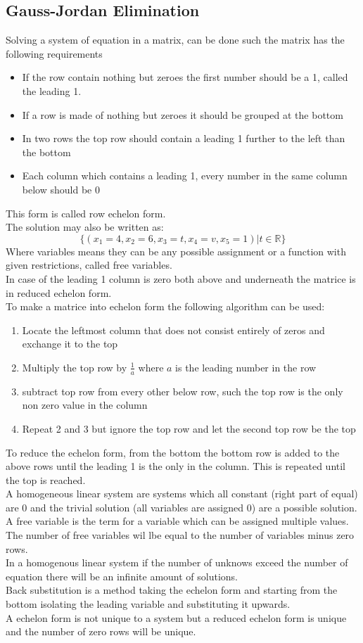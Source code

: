 \documentclass[12pt, a4paper]{article}
\begin{document}
		\subsection{Gauss-Jordan Elimination}
			Solving a system of equation in a matrix, can be done such the matrix has the following requirements
			\begin{itemize}
				\item If the row contain nothing but zeroes the first number should be a 1, called the leading 1.
				\item If a row is made of nothing but zeroes it should be grouped at the bottom
				\item In two rows the top row should contain a leading 1 further to the left than the bottom
				\item Each column which contains a leading 1, every number in the same column below should be 0
			\end{itemize}
			This form is called row echelon form.\\
			The solution may also be written as:
			$$\{(x_1=4,x_2=6,x_3=t,x_4=v,x_5=1)|t\in \mathbb{R} \}$$
			Where variables means they can be any possible assignment or a function with given restrictions, called free variables.\\
			In case of the leading 1 column is zero both above and underneath the matrice is in reduced echelon form.\\[4mm]
			To make a matrice into echelon form the following algorithm can be used:\\
			\begin{enumerate}
				\item Locate the leftmost column that does not consist entirely of zeros and exchange it to the top
				\item Multiply the top row by $\frac{1}{a}$ where $a$ is the leading number in the row
				\item subtract top row from every other below row, such the top row is the only non zero value in the column
				\item Repeat 2 and 3 but ignore the top row and let the second top row be the top
			\end{enumerate}
			To reduce the echelon form, from the bottom the bottom row is added to the above rows until the leading 1 is the only in the column. This is repeated until the top is reached.\\
			A homogeneous linear system are systems which all constant (right part of equal) are 0 and the trivial solution (all variables are assigned 0) are a possible solution.\\
			A free variable is the term for a variable which can be assigned multiple values. The number of free variables wil lbe equal to the number of variables minus zero rows.\\
			In a homogenous linear system if the number of unknows exceed the number of equation there will be an infinite amount of solutions.\\
			Back substitution is a method taking the echelon form and starting from the bottom isolating the leading variable and substituting it upwards.\\
			A echelon form is not unique to a system but a reduced echelon form is unique and the number of zero rows will be unique.
\end{document}
